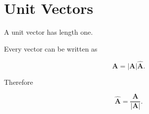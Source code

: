 \section{Unit Vectors}

A unit vector has length one.

Every vector can be written as

\[
\mathbf A
=
|\mathbf A|
\hat{\mathbf A}.
\]

Therefore

\[
\hat{\mathbf A}
=
\frac{\mathbf A}{|\mathbf A|}.
\]

